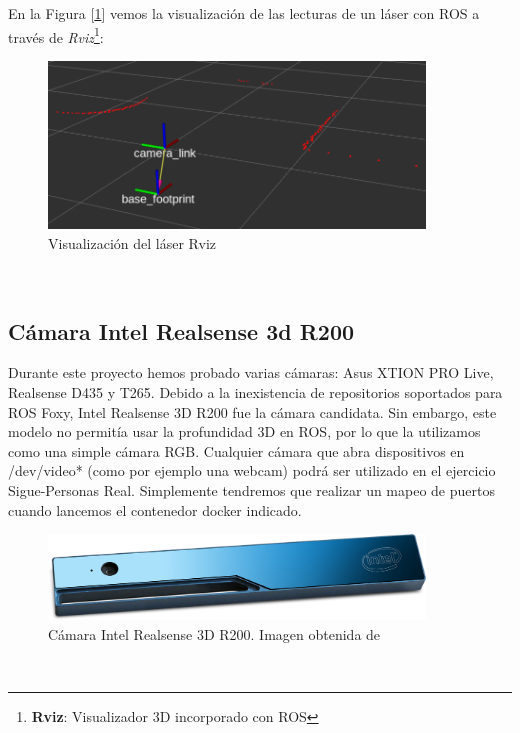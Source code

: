 En la Figura [\ref{fig:laser_rviz}] vemos la visualización de las lecturas de un láser con ROS a través de \textit{Rviz}\footnote{\textbf{Rviz}: Visualizador 3D incorporado con ROS}:\\

\begin{figure} [H]
  \begin{center}
    \includegraphics[width=10cm]{imagenes/cap3/laser-rviz.png}
  \end{center}
  \caption[Visualización del láser en Rviz]{Visualización del láser Rviz}
  \label{fig:laser_rviz}
\end{figure}\


\subsection{Cámara Intel Realsense 3d R200}
\label{subsec:turtlebot2_intel_realsense_3d}

Durante este proyecto hemos probado varias cámaras: Asus XTION PRO Live, Realsense D435 y T265. Debido a la inexistencia de repositorios soportados para ROS Foxy, Intel Realsense 3D R200 fue la cámara candidata. Sin embargo, este modelo no permitía usar la profundidad 3D en ROS, por lo que la utilizamos como una simple cámara RGB. Cualquier cámara que abra dispositivos en /dev/video* (como por ejemplo una webcam) podrá ser utilizado en el ejercicio Sigue-Personas Real. Simplemente tendremos que realizar un mapeo de puertos cuando lancemos el contenedor docker indicado.\\

\begin{figure} [H]
  \begin{center}
    \includegraphics[width=10cm]{imagenes/cap3/r200.jpg}
  \end{center}
  \caption[Cámara Intel Realsense 3D R200]{Cámara Intel Realsense 3D R200. Imagen obtenida de \cite{R200}}
  \label{fig:camara_r200}
\end{figure}\

